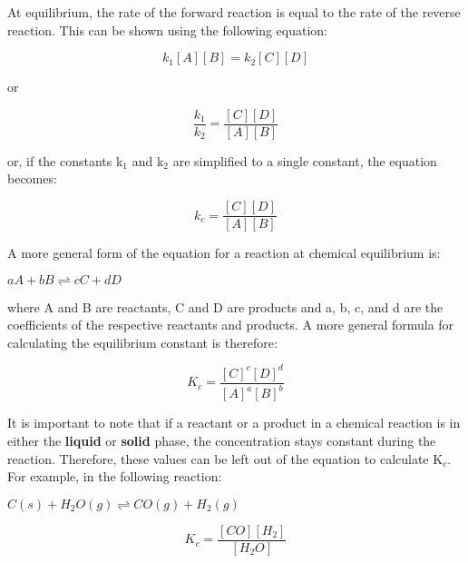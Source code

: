 At equilibrium, the rate of the forward reaction is equal to the rate of the reverse reaction. This can be shown using the following equation:

\begin{equation*}
k_{1}[A][B] = k_{2}[C][D]
\end{equation*}

\begin{center}
or
\end{center}

\begin{equation*}
\frac{k_{1}}{k_{2}} = \frac{[C][D]}{[A][B]}
\end{equation*}

or, if the constants k$_{1}$ and k$_{2}$ are simplified to a single constant, the equation becomes:

\begin{equation*}
k_{c} = \frac{[C][D]}{[A][B]} 
\end{equation*}

A more general form of the equation for a reaction at chemical equilibrium is:
\begin{center}
${aA + bB \rightleftharpoons cC + dD}$
\end{center}

where A and B are reactants, C and D are products and a, b, c, and d are the coefficients of the respective reactants and products. A more general formula for calculating the equilibrium constant is therefore:

\begin{equation*}
K_{c} = \frac{[C]^{c}[D]^{d}}{[A]^{a}[B]^{b}} 
\end{equation*}

It is important to note that if a reactant or a product in a chemical reaction is in either the \textbf{liquid} or \textbf{solid} phase, the concentration stays constant during the reaction. Therefore, these values can be left out of the equation to calculate K$_{c}$. For example, in the following reaction:\\

\begin{center}
\rm${C(s) + H_{2}O(g) \rightleftharpoons CO(g) + H_{2}(g)}$
\end{center}

\begin{equation*}
K_{c} = \frac{[CO][H_{2}]}{[H_{2}O]}
\end{equation*}


